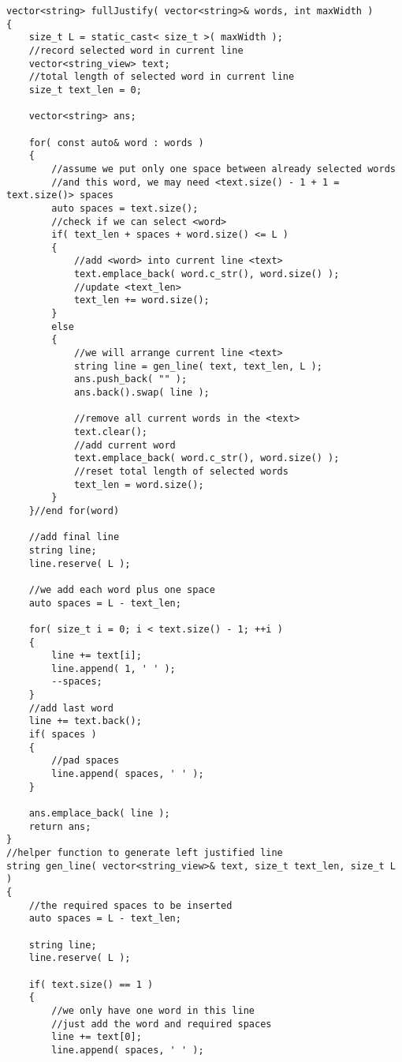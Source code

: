 \setcounter{lstlisting}{0}
\begin{lstlisting}[style=customc, caption={Greedy}]
vector<string> fullJustify( vector<string>& words, int maxWidth )
{
    size_t L = static_cast< size_t >( maxWidth );
    //record selected word in current line
    vector<string_view> text;
    //total length of selected word in current line
    size_t text_len = 0;

    vector<string> ans;

    for( const auto& word : words )
    {
        //assume we put only one space between already selected words
        //and this word, we may need <text.size() - 1 + 1 = text.size()> spaces
        auto spaces = text.size();
        //check if we can select <word>
        if( text_len + spaces + word.size() <= L )
        {
            //add <word> into current line <text>
            text.emplace_back( word.c_str(), word.size() );
            //update <text_len>
            text_len += word.size();
        }
        else
        {
            //we will arrange current line <text>
            string line = gen_line( text, text_len, L );
            ans.push_back( "" );
            ans.back().swap( line );

            //remove all current words in the <text>
            text.clear();
            //add current word
            text.emplace_back( word.c_str(), word.size() );
            //reset total length of selected words
            text_len = word.size();
        }
    }//end for(word)

    //add final line
    string line;
    line.reserve( L );

    //we add each word plus one space
    auto spaces = L - text_len;

    for( size_t i = 0; i < text.size() - 1; ++i )
    {
        line += text[i];
        line.append( 1, ' ' );
        --spaces;
    }
    //add last word
    line += text.back();
    if( spaces )
    {
        //pad spaces
        line.append( spaces, ' ' );
    }

    ans.emplace_back( line );
    return ans;
}
//helper function to generate left justified line
string gen_line( vector<string_view>& text, size_t text_len, size_t L )
{
    //the required spaces to be inserted
    auto spaces = L - text_len;

    string line;
    line.reserve( L );

    if( text.size() == 1 )
    {
        //we only have one word in this line
        //just add the word and required spaces
        line += text[0];
        line.append( spaces, ' ' );


\end{lstlisting}
